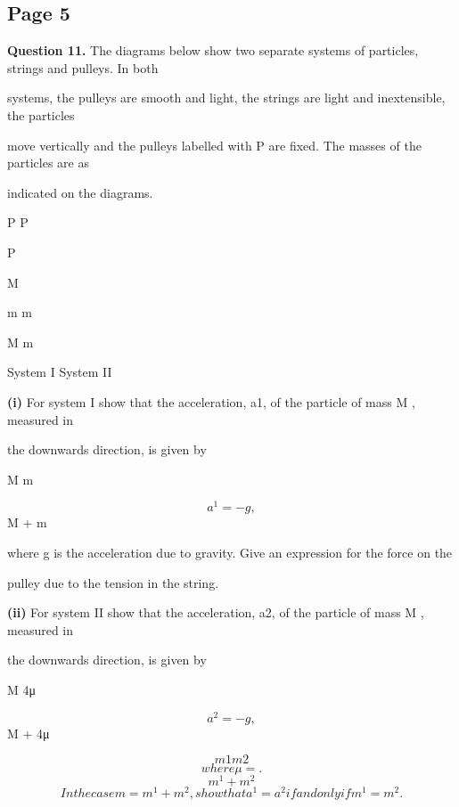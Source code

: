 \documentclass[12pt]{article}
\begin{document}
\subsection*{Page 5}
\begin{flushleft}
\bigskip\textbf{Question 11.} The diagrams below show two separate systems of particles, strings and pulleys. In both\par
systems, the pulleys are smooth and light, the strings are light and inextensible, the particles\par
move vertically and the pulleys labelled with P are fixed. The masses of the particles are as\par
indicated on the diagrams.\par
P P\par
P\par
M\par
m m\par
M m\par
System I System II\par
\textbf{(i)} For system I show that the acceleration, a1, of the particle of mass M , measured in\par
the downwards direction, is given by\par
M m\par
\[a^1 = - g ,\]
M + m\par
where g is the acceleration due to gravity. Give an expression for the force on the\par
pulley due to the tension in the string.\par
\textbf{(ii)} For system II show that the acceleration, a2, of the particle of mass M , measured in\par
the downwards direction, is given by\par
M 4μ\par
\[a^2 = - g ,\]
M + 4μ\par
\[m1m2\]
\[where μ = .\]
\[m^1 + m^2\]
\[In the case m = m^1 + m^2, show that a^1 = a^2 if and only if m^1 = m^2.\]
\end{flushleft}
\end{document}

